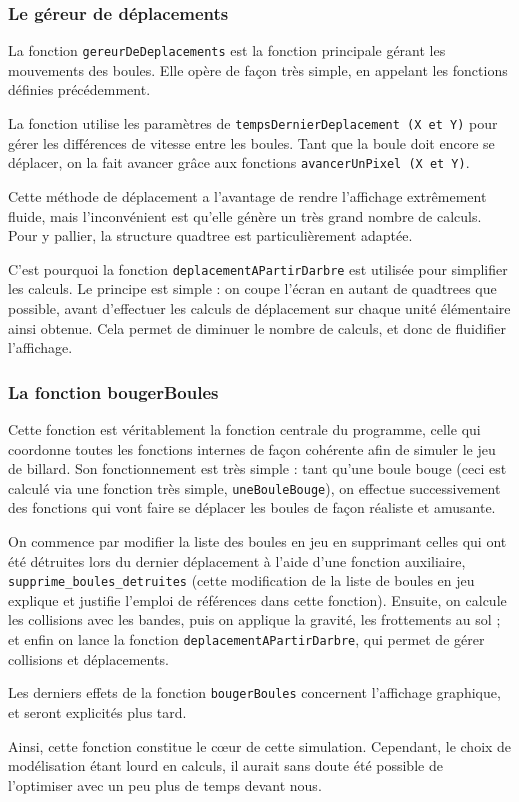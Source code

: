 \documentclass[10pt]{article}
\begin{document}
\subsubsection{Le géreur de déplacements}
La fonction \texttt{gereurDeDeplacements} est la fonction principale gérant les mouvements des boules. Elle opère de façon très simple,
en appelant les fonctions définies précédemment.
\par La fonction utilise les paramètres de \texttt{tempsDernierDeplacement (X et Y)} pour gérer les différences de vitesse entre les boules.
Tant que la boule doit encore se déplacer, on la fait avancer grâce aux fonctions \texttt{avancerUnPixel (X et Y)}.
\par Cette méthode de déplacement a l'avantage de rendre l'affichage extrêmement fluide, mais l'inconvénient est qu'elle génère
un très grand nombre de calculs. Pour y pallier, la structure quadtree est particulièrement adaptée.
\par C'est pourquoi la fonction \texttt{deplacementAPartirDarbre} est utilisée pour simplifier les calculs. Le principe est simple : on
coupe l'écran en autant de quadtrees que possible, avant d'effectuer les calculs de déplacement sur chaque unité élémentaire ainsi
obtenue. Cela permet de diminuer le nombre de calculs, et donc de fluidifier l'affichage.
\subsubsection{La fonction bougerBoules}
Cette fonction est véritablement la fonction centrale du programme, celle qui coordonne toutes les fonctions internes de façon cohérente
afin de simuler le jeu de billard. Son fonctionnement est très simple : tant qu'une boule bouge (ceci est calculé via une fonction très
simple, \texttt{uneBouleBouge}), on effectue successivement des fonctions qui vont faire se déplacer les boules de façon réaliste et amusante.
\par On commence par modifier la liste des boules en jeu en supprimant celles qui ont été détruites lors du dernier déplacement à l'aide
d'une fonction auxiliaire, \texttt{supprime\_boules\_detruites} (cette modification de la liste de boules en jeu explique et justifie
l'emploi de références dans cette fonction). Ensuite, on calcule les collisions avec les bandes, puis on applique la gravité, les frottements
au sol ; et enfin on lance la fonction \texttt{deplacementAPartirDarbre}, qui permet de gérer collisions et déplacements.
\par Les derniers effets de la fonction \texttt{bougerBoules} concernent l'affichage graphique, et seront explicités plus tard.
\par Ainsi, cette fonction constitue le cœur de cette simulation. Cependant, le choix de modélisation étant lourd en calculs, il aurait
sans doute été possible de l'optimiser avec un peu plus de temps devant nous.
\end{document}
